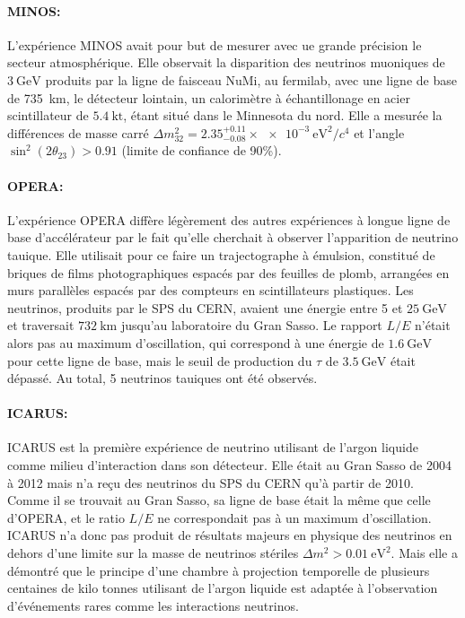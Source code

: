            \paragraph{MINOS\cite{Collaboration2014}:} L'expérience MINOS avait pour but de mesurer avec ue grande précision le secteur atmosphérique. Elle observait la disparition des neutrinos muoniques de $\SI{3}{\giga\electronvolt}$ produits par la ligne de faisceau NuMi, au fermilab, avec une ligne de base de \SI{735}{\kilo\meter}, le détecteur lointain, un calorimètre à échantillonage en acier scintillateur de $\SI{5.4}{\kilo\tonne}$, étant situé dans le Minnesota du nord. Elle a mesurée la différences de masse carré $\Delta m_{32}^2 = 2.35^{+0.11}_{-0.08}\times\SI{e-3}{\electronvolt\squared\per c^4}$ et l'angle $\sin^2(2\theta_{23}) > 0.91$ (limite de confiance de 90\%). 
            
            \paragraph{OPERA\cite{Agafonova2018}:} L'expérience OPERA diffère légèrement des autres expériences à longue ligne de base d'accélérateur par le fait qu'elle cherchait à observer l'apparition de neutrino tauique. Elle utilisait pour ce faire un trajectographe à émulsion, constitué de  briques de films photographiques espacés par des feuilles de plomb, arrangées en murs parallèles espacés par des compteurs en scintillateurs plastiques. Les neutrinos, produits par le SPS du CERN, avaient une énergie entre 5 et $\SI{25}{\giga\electronvolt}$ et traversait $\SI{732}{\kilo\meter}$ jusqu'au laboratoire du Gran Sasso. Le rapport $L/E$ n'était alors pas au maximum d'oscillation, qui correspond à une énergie de $\SI{1.6}{\giga\electronvolt}$ pour cette ligne de base, mais le seuil de production du $\tau$ de $\SI{3.5}{\giga\electronvolt}$ était dépassé. Au total, 5 neutrinos tauiques ont été observés.
            
            \paragraph{ICARUS\cite{icarus}:} ICARUS est la première expérience de neutrino utilisant de l'argon liquide comme milieu d'interaction dans son détecteur. Elle était au Gran Sasso de 2004 à 2012 mais n'a reçu des neutrinos du SPS du CERN qu'à partir de 2010. Comme il se trouvait au Gran Sasso, sa ligne de base était la même que celle d'OPERA, et le ratio $L/E$ ne correspondait pas à un maximum d'oscillation. ICARUS n'a donc pas produit de résultats majeurs en physique des neutrinos en dehors d'une limite sur la masse de neutrinos stériles $\Delta m^2 > \SI{0.01}{\electronvolt\squared}$. Mais elle a démontré que le principe d'une chambre à projection temporelle de plusieurs centaines de kilo tonnes utilisant de l'argon liquide est adaptée à l'observation d'événements rares comme les interactions neutrinos. 
            
